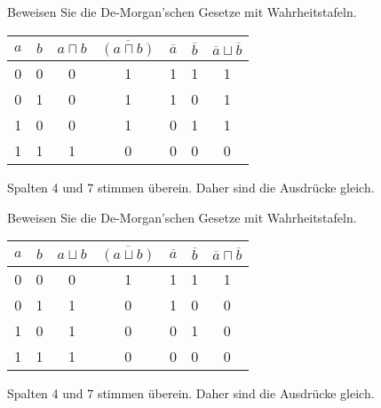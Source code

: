 \begin{frame}\onslide<+->%
    \begin{exercise}
    Beweisen Sie die De-Morgan'schen Gesetze mit Wahrheitstafeln.
    \end{exercise}
    \begin{solve}[$\overline{a\sqcap b} = \overline a\sqcup\overline b$]
        \begin{center}\begin{tabular}{|c|c|c|c|c|c|c|}
            \hline
            $a$&$b$&$a\sqcap b$&$\overline{(a\sqcap b)}$&$\overline a$&$\overline b$&$\overline a\sqcup\overline b$ \\
            \hline
            0&0&0&1&1&1&1 \\
            \hline
            0&1&0&1&1&0&1 \\
            \hline
            1&0&0&1&0&1&1 \\
            \hline
            1&1&1&0&0&0&0 \\
            \hline
        \end{tabular}\end{center}
        Spalten 4 und 7 stimmen überein. Daher sind die Ausdrücke gleich.
    \end{solve}
\end{frame}
\resetframecounters
\begin{frame}[noframenumbering]\onslide<+->%
    \begin{exercise}
        Beweisen Sie die De-Morgan'schen Gesetze mit Wahrheitstafeln.
        \end{exercise}
    \begin{solve}[$\overline{a\sqcup b} = \overline a\sqcap\overline b$]
        \begin{center}\begin{tabular}{|c|c|c|c|c|c|c|}
            \hline
            $a$&$b$&$a\sqcup b$&$\overline{(a\sqcup b)}$&$\overline a$&$\overline b$&$\overline a\sqcap\overline b$ \\
            \hline
            0&0&0&1&1&1&1 \\
            \hline
            0&1&1&0&1&0&0 \\
            \hline
            1&0&1&0&0&1&0 \\
            \hline
            1&1&1&0&0&0&0 \\
            \hline
        \end{tabular}\end{center}
        Spalten 4 und 7 stimmen überein. Daher sind die Ausdrücke gleich.
    \end{solve}
\end{frame}
